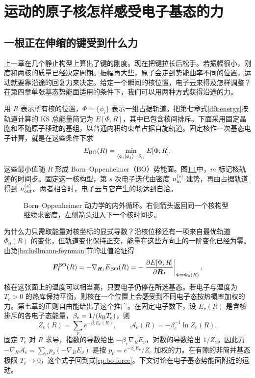 \chapter{运动的原子核怎样感受电子基态的力}
\section{一根正在伸缩的键受到什么力}
上一章在几个静止构型上算出了键的刚度。现在把键拉长后松手。若振幅很小，刚度和两核的质量已经决定周期。振幅再大些，原子会走到势能曲率不同的位置，运动就要靠沿途的回复力来决定。给定一个瞬间的核位置，电子云来得及怎样调整？在第四章单张基态势能面适用的条件下，我们可以用两种方式获得沿途的力。

用 $R$ 表示所有核的位置，$\Phi=\{\phi_i\}$ 表示一组占据轨道。把第七章式\eqref{dft:energy}按轨道计算的 KS 总能量简记为 $E[\Phi,R]$，其中已包含核间排斥。下面采用固定晶胞和不随原子移动的基组，以普通内积约束单占据自旋轨道。固定核作一次基态电子计算，就是在这些条件下求
\begin{equation}\label{cp:bo-surface}
 E_{\rm BO}(R)=\min_{\langle\phi_i|\phi_j\rangle=\delta_{ij}}E[\Phi,R].
\end{equation}
这些最小值随 $R$ 形成 Born--Oppenheimer（BO）势能面。图\ref{cp:bo-loops}中，$m$ 标记核轨迹的时间步。固定这一核构型，第 $s$ 次电子迭代由密度 $n_{\rm in}^{(s)}$ 建势，再由占据轨道得到 $n_{\rm out}^{(s)}$。两者相合时，电子云与它产生的场达到自洽。

\begin{figure}[htbp]
\centering

\caption{Born--Oppenheimer 动力学的内外循环。右侧箭头返回同一个核构型继续求密度，左侧箭头进入下一个核时间步。}
\label{cp:bo-loops}
\end{figure}

为什么力只需取能量对核坐标的显式导数？沿核位移还有一项来自最优轨道 $\Phi_0(R)$ 的变化，但轨道变化保持正交，能量在这些方向上的一阶变化已经为零。由第\ref{bo:hellmann-feynman}节的驻值论证得
\begin{equation}\label{cp:bo-force}
 \bm F_I^{\rm BO}(R)=-\nabla_{\bm R_I}E_{\rm BO}(R)
 =-\left.\frac{\partial E[\Phi,R]}{\partial\bm R_I}\right|_{\Phi=\Phi_0(R)} .
\end{equation}
核在这张面上的温度可以相当高，只要电子仍停在所选基态。若电子与温度为 $T_e>0$ 的热库保持平衡，则核在一个位置上会感受到不同电子态按热概率加权的力。第七章的正则自由能给出了这个推广。在固定电子数下，设 $E_\nu(R)$ 是含核排斥的各电子态能量，$\beta_e=1/(k_{\mathrm B} T_e)$，则
\[
 Z_e(R)=\sum_\nu e^{-\beta_e E_\nu(R)},\qquad
 \mathcal A_e(R)=-\beta_e^{-1}\ln Z_e(R).
\]
固定 $T_e$ 对 $R$ 求导，指数的导数给出 $-\beta_e\nabla_R E_\nu$，对数的导数给出 $1/Z_e$。因此力 $-\nabla_R\mathcal A_e=\sum_\nu p_\nu(-\nabla_R E_\nu)$ 是按 $p_\nu=e^{-\beta_e E_\nu}/Z_e$ 加权的力。在有隙的非简并基态极限 $T_e\to0$，这个式子回到式\eqref{cp:bo-force}。下文讨论在电子基态势能面附近的运动。

